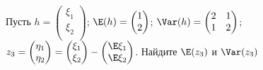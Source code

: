 \documentclass[pdftex,11pt,openany]{book}\usepackage[]{graphicx}\usepackage[]{color}
\begin{document}
\begin{problem}
Пусть $h =  \begin{pmatrix}
\xi_1 \\
\xi_2 \\
\end{pmatrix} $; $\E (h) =  \begin{pmatrix}
1\\
2\\
\end{pmatrix} $; $\Var (h) =  \begin{pmatrix}
2 & 1 \\
1 & 2 \\
\end{pmatrix} $; $z_3 =  \begin{pmatrix}
\eta_1 \\
\eta_2 \\
\end{pmatrix}  =  \begin{pmatrix}
\xi_1 \\
\xi_2 \\
\end{pmatrix}  -  \begin{pmatrix}
\E \xi_1 \\
\E \xi_2 \\
\end{pmatrix} $. Найдите $\E (z_3)$ и $\Var (z_3)$
\end{problem}
\end{document}
